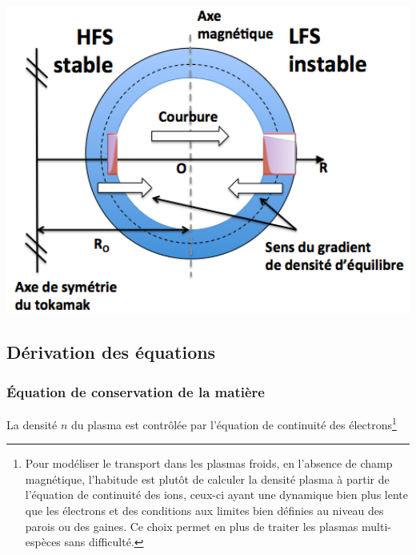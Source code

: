 \begin{refsection}
\begin{minipage}{1\textwidth}
\begin{minipage}{0.4\textwidth}
\end{minipage}
\qquad
\begin{minipage}{0.6\textwidth}
\centering
    \includegraphics[width=1\textwidth]{figures/2-stable.png}
    \label{2-stable}
\end{minipage}
\end{minipage}


\subsection{Dérivation des équations}
\subsubsection{Équation de conservation de la matière}
La densité $n$ du plasma est contrôlée par l'équation de continuité des
électrons\footnote{Pour modéliser le transport dans les plasmas froids, en
l'absence de champ magnétique, l'habitude est plutôt de calculer la densité
plasma à partir de l'équation de continuité des ions, ceux-ci ayant une
dynamique bien plus lente que les électrons et des conditions aux limites
bien définies au niveau des parois ou des gaines. Ce choix permet en plus de
traiter les plasmas multi-espèces sans difficulté.

}
\end{refsection}
